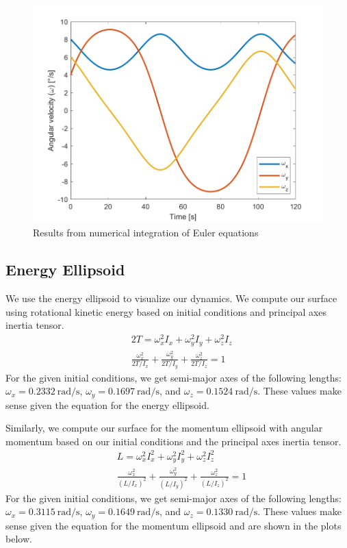 \begin{figure}[H]
\centering
\includegraphics[scale=0.6]{Images/ps2_euler_equations.png}
\caption{Results from numerical integration of Euler equations}
\label{fig:ps2_euler_equations}
\end{figure}

\subsection{Energy Ellipsoid}
We use the energy ellipsoid to visualize our dynamics. We compute our surface using rotational kinetic energy based on initial conditions and principal axes inertia tensor.
\begin{align*}
    &2T = \omega_{x}^{2} I_{x} + \omega_{y}^{2} I_{y} + \omega_{z}^{2} I_{z} \\
    &\frac{\omega_{x}^{2}}{2T/I_{x}} + \frac{\omega_{y}^{2}}{2T/I_{y}} + \frac{\omega_{z}^{2}}{2T/I_{z}} = 1
\end{align*}
For the given initial conditions, we get semi-major axes of the following lengths: $\omega_{x} = \qty{0.2332}{\radian\per\second}$, $\omega_{y} = \qty{0.1697}{\radian\per\second}$, and $\omega_{z} = \qty{0.1524}{\radian\per\second}$. These values make sense given the equation for the energy ellipsoid.

Similarly, we compute our surface for the momentum ellipsoid with angular momentum based on our initial conditions and the principal axes inertia tensor.
\begin{align*}
    &L = \omega_{x}^{2} I_{x}^{2} + \omega_{y}^{2} I_{y}^{2} + \omega_{z}^{2} I_{z}^{2} \\
    &\frac{\omega_{x}^{2}}{(L/I_{x})^{2}} + \frac{\omega_{y}^{2}}{(L/I_{y})^{2}} + \frac{\omega_{z}^{2}}{(L/I_{z})^{2}} = 1
\end{align*}
For the given initial conditions, we get semi-major axes of the following lengths: $\omega_{x} = \qty{0.3115}{\radian\per\second}$, $\omega_{y} = \qty{0.1649}{\radian\per\second}$, and $\omega_{z} = \qty{0.1330}{\radian\per\second}$. These values make sense given the equation for the momentum ellipsoid and are shown in the plots below.

